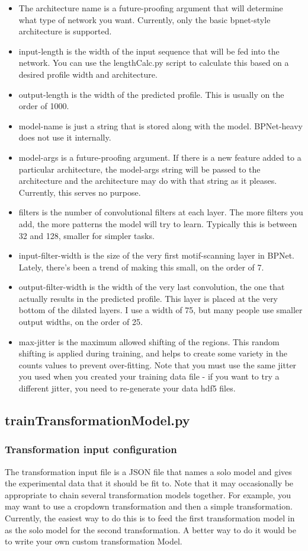 \documentclass{article}
\begin{document}
\begin{itemize}
    \item The architecture name is a future-proofing argument that will determine what type of network you want. Currently, only the basic bpnet-style architecture is supported. 
    \item input-length is the width of the input sequence that will be fed into the network. You can use the lengthCalc.py script to calculate this based on a desired profile width and architecture.
    \item output-length is the width of the predicted profile. This is usually on the order of 1000.
    \item model-name is just a string that is stored along with the model. BPNet-heavy does not use it internally.
    \item model-args is a future-proofing argument. If there is a new feature added to a particular architecture, the model-args string will be passed to the architecture and the architecture may do with that string as it pleases. Currently, this serves no purpose. 
    \item filters is the number of convolutional filters at each layer. The more filters you add, the more patterns the model will try to learn. Typically this is between 32 and 128, smaller for simpler tasks. 
    \item input-filter-width is the size of the very first motif-scanning layer in BPNet. Lately, there's been a trend of making this small, on the order of 7. 
    \item output-filter-width is the width of the very last convolution, the one that actually results in the predicted profile. This layer is placed at the very bottom of the dilated layers. I use a width of 75, but many people use smaller output widths, on the order of 25. 
    \item max-jitter is the maximum allowed shifting of the regions. This random shifting is applied during training, and helps to create some variety in the counts values to prevent over-fitting. Note that you must use the same jitter you used when you created your training data file - if you want to try a different jitter, you need to re-generate your data hdf5 files. 
\end{itemize}

\subsection{trainTransformationModel.py}
\subsubsection{Transformation input configuration}
The transformation input file is a JSON file that names a solo model and gives the experimental data that it should be fit to. 
Note that it may occasionally be appropriate to chain several transformation models together.
For example, you may want to use a cropdown transformation and then a simple transformation. 
Currently, the easiest way to do this is to feed the first transformation model in as the solo model
for the second transformation. A better way to do it would be to write your own custom transformation Model.
\end{document}
